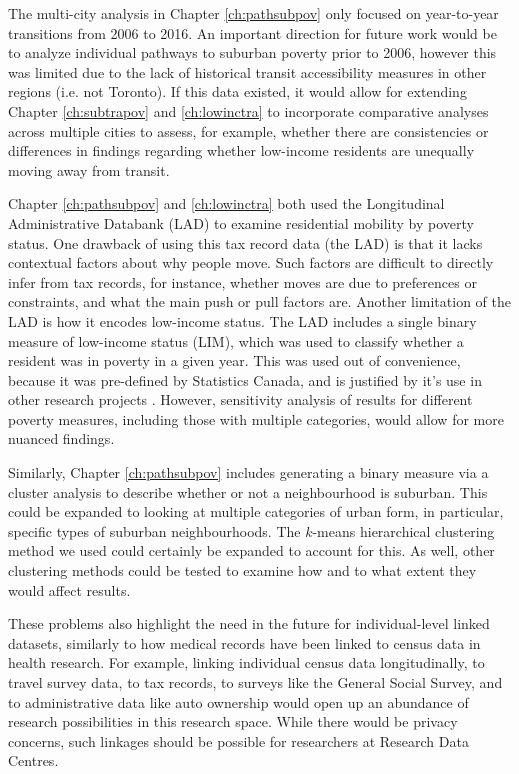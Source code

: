 The multi-city analysis in Chapter \ref{ch:pathsubpov} only focused on year-to-year transitions from 2006 to 2016. An important direction for future work would be to analyze individual pathways to suburban poverty prior to 2006, however this was limited due to the lack of historical transit accessibility measures in other regions (i.e. not Toronto). If this data existed, it would allow for extending Chapter \ref{ch:subtrapov} and \ref{ch:lowinctra} to incorporate comparative analyses across multiple cities to assess, for example, whether there are consistencies or differences in findings regarding whether low-income residents are unequally moving away from transit.

Chapter \ref{ch:pathsubpov} and \ref{ch:lowinctra} both used the Longitudinal Administrative Databank (LAD) to examine residential mobility by poverty status. One drawback of using this tax record data (the LAD) is that it lacks contextual factors about why people move. Such factors are difficult to directly infer from tax records, for instance, whether moves are due to preferences or constraints, and what the main push or pull factors are. Another limitation of the LAD is how it encodes low-income status. The LAD includes a single binary measure of low-income status (LIM), which was used to classify whether a resident was in poverty in a given year. This was used out of convenience, because it was pre-defined by Statistics Canada, and is justified by it's use in other research projects \cite{picot_immigration_2014,allen_sizing_2019,brown_money_2019}. However, sensitivity analysis of results for different poverty measures, including those with multiple categories, would allow for more nuanced findings. 

Similarly, Chapter \ref{ch:pathsubpov} includes generating a binary measure via a cluster analysis to describe whether or not a neighbourhood is suburban. This could be expanded to looking at multiple categories of urban form, in particular, specific types of suburban neighbourhoods. The $k$-means hierarchical clustering method we used could certainly be expanded to account for this. As well, other clustering methods could be tested to examine how and to what extent they would affect results.

These problems also highlight the need in the future for individual-level linked datasets, similarly to how medical records have been linked to census data in health research. For example, linking individual census data longitudinally, to travel survey data, to tax records, to surveys like the General Social Survey, and to administrative data like auto ownership would open up an abundance of research possibilities in this research space. While there would be privacy concerns, such linkages should be possible for researchers at Research Data Centres.



